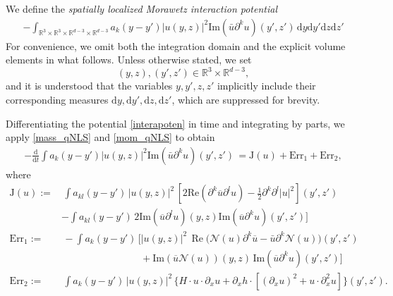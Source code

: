 \documentclass[11pt,letterpaper,reqno]{amsart}
\numberwithin{equation}{section}
\theoremstyle{definition}
\theoremstyle{remark}
\newcommand{\pa}{\partial}
\begin{document}
We define the \textit{spatially localized Morawetz interaction potential}
\begin{align} \label{interapoten}
	-\int_{\mathbb{R}^3\times \mathbb{R}^3\times  \mathbb{R}^{d-3} \times \mathbb{R}^{d-3}} a_k(y-y')   |u(y,z)|^2      \mathrm{Im} (\bar{u} \pa^k u) (y',z') \, \mathrm{d}y\mathrm{d}y'\mathrm{d}z\mathrm{d}z'
\end{align}
For convenience, we omit both the integration domain and the explicit volume elements in what follows. Unless otherwise stated, we set
$$ (y,z),  (y',z') \in \mathbb{R}^3\times \mathbb{R}^{d-3}, $$
and it is understood that the variables $y, y', z, z'$ implicitly include their corresponding measures $\mathrm{d}y,\mathrm{d}y',\mathrm{d}z,\mathrm{d}z'$, which are suppressed for brevity.

Differentiating the   potential \eqref{interapoten} in time and integrating by parts, we apply \eqref{mass_qNLS} and \eqref{mom_qNLS} to obtain
\begin{align}
	-\frac{ \mathrm{d}}{\mathrm{d}t} \int a_k(y-y')  |u(y,z)|^2      \mathrm{Im} (\bar{u} \pa^k u) (y',z') \, = \mathrm{J}(u) + \text{Err}_1+ \text{Err}_2,  \label{interapoten_t1}
\end{align}
where
\begin{align*}
   \mathrm{J}(u):=&\,\int a_{ kl}(y-y')\,  |u(y,z)|^2 \, [2\mathrm{Re} (\pa^k \overline{u}  \pa^l u) -   \frac{1}{2}\pa^k \pa^l|u|^2 ](y',z')\nonumber \\
	 &- \int a_{ kl}(y-y')\,    2 \mathrm{Im}(\overline{u}  \pa^l u)(y,z)  \mathrm{Im}(\overline{u}  \pa^k u)  (y',z')]\,  \nonumber \\
   \text{Err}_1:=&\,- \int a_k(y-y')\, \Big[ |u(y,z)|^2 \, \operatorname{Re}\big(\mathcal{N}(u)\partial^k \overline{u} - \bar{u} \partial^k\mathcal{N}(u)\big)(y',z') \nonumber\\
    &\qquad\qquad\qquad\qquad+ \mathrm{Im} \left( \overline{u}\mathcal{N}(u) \right)(y,z) \, \mathrm{Im}(\overline{u}  \pa^k u)(y',z') \Big]\,  \nonumber\\
	\text{Err}_2:=&\,\int a_k(y-y')\, |u(y,z)|^2 \, \{H \cdot u \cdot \pa_x u  + \pa_x h \cdot[ (\pa_x u)^2+u\cdot \pa_x^2 u]\}(y',z').\,   
\end{align*}
\end{document}
